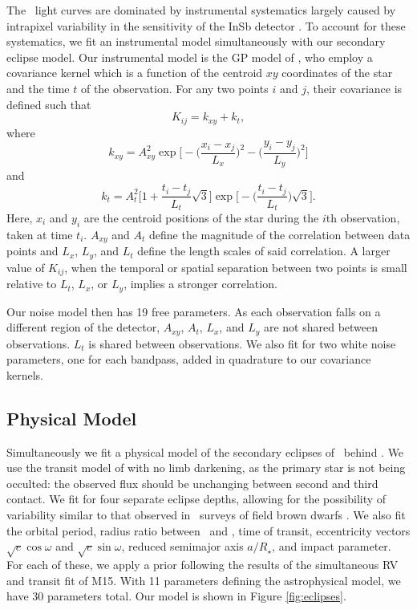 The \spitz\ light curves are dominated by instrumental systematics largely caused by 
intrapixel variability in the sensitivity of the InSb detector \citep{Charbonneau05, Knutson08}.
To account for these systematics, we fit an instrumental model 
simultaneously with our secondary eclipse model.
Our instrumental model is the GP model of \citet{Evans15},
who employ a covariance kernel which is a function of the centroid $xy$ coordinates of the
star and the time $t$ of the observation. 
For any two points $i$ and $j$, their covariance is defined such that
\begin{equation}
K_{ij} = k_{xy} + k_t,
\end{equation}
where
\begin{equation}
k_{xy} = A_{xy}^2 \exp\bigg[-\bigg(\frac{x_i - x_j}{L_x}\bigg)^2 - \bigg(\frac{y_i - y_j}{L_y}\bigg)^2 \bigg]
\end{equation}
and
\begin{equation}
k_t = A_t^2 \bigg[1 + \frac{t_i - t_j}{L_t} \sqrt{3} \bigg] \exp \bigg[ - \bigg(\frac{t_i - t_j}{L_t}\bigg) \sqrt{3}\bigg].
\end{equation}
Here, $x_i$ and $y_i$ are the centroid positions of the star during the $i$th observation, taken at time $t_i$. 
$A_{xy}$ and $A_t$ define the magnitude of the correlation between data points and 
$L_x$, $L_y$, and $L_t$ define the length scales of said correlation. 
A larger value of $K_{ij}$, when the temporal or spatial separation between two points is small
relative to $L_t$, $L_x$, or $L_y$, implies a stronger correlation.

Our noise model then has 19 free parameters. As each observation falls on a different region
of the detector, $A_{xy}$, $A_t$, $L_x$, and $L_y$ are not shared between observations. 
$L_t$ is shared between observations. 
We also fit for two white noise parameters, one for each bandpass, added in quadrature to our covariance kernels.

\subsection{Physical Model}

Simultaneously we fit a physical model of the secondary eclipses of \LC\ behind \LA. 
We use the transit model of \citet{Mandel02} with no limb darkening, as the primary star
is not being occulted:
the observed flux should be unchanging between second and third contact. 
We fit for four separate eclipse depths, allowing for the possibility of variability 
similar to that observed in \spitz\ surveys of field brown dwarfs \citep{Buenzli12, Metchev15}.
We also fit the orbital period, radius ratio between \LA\ and \LC, time of transit,
eccentricity vectors $\sqrt{e} \cos \omega$ and $\sqrt{e} \sin \omega$, reduced semimajor
axis $a/R_\star$, and impact parameter.
For each of these, we apply a prior following the results of the simultaneous RV and transit 
fit of M15. 
With 11 parameters defining the astrophysical model, we have 30 parameters total.
Our model is shown in Figure \ref{fig:eclipses}.


